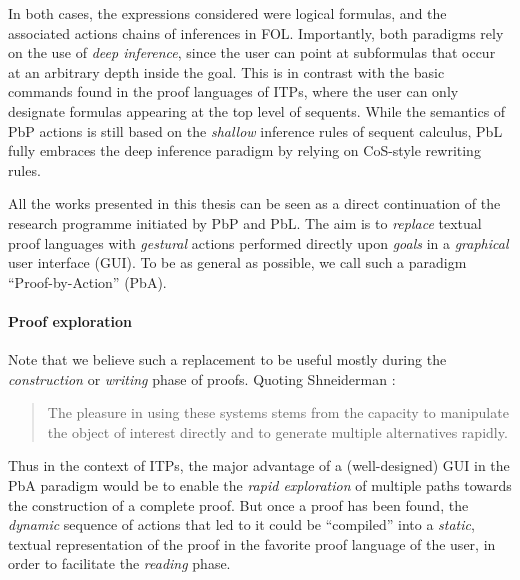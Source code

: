 In both cases, the expressions considered were logical formulas, and the
associated actions chains of inferences in FOL. Importantly, both paradigms rely
on the use of \emph{deep inference}, since the user can point at subformulas
that occur at an arbitrary depth inside the goal. This is in contrast with the
basic commands found in the proof languages of ITPs, where the user can only
designate formulas appearing at the top level of sequents. While the
semantics of PbP actions is still based on the \emph{shallow} inference rules of
sequent calculus, PbL fully embraces the deep inference paradigm by relying on
CoS-style rewriting rules.

\begin{emphpar}
  All the works presented in this thesis can be seen as a direct continuation of
  the research programme initiated by PbP and PbL. The aim is to \emph{replace}
  textual proof languages with \emph{gestural} actions performed directly upon
  \emph{goals} in a \emph{graphical} user interface (GUI). To be as general as
  possible, we call such a paradigm ``Proof-by-Action'' (PbA).
\end{emphpar}

\paragraph{Proof exploration}

Note that we believe such a replacement to be useful mostly during the
\emph{construction} or \emph{writing} phase of proofs. Quoting Shneiderman
\cite{shneiderman_direct_1983}:
\begin{quote}
  The pleasure in using these systems stems from the capacity to manipulate the
object of interest directly and to generate multiple alternatives rapidly.
\end{quote}
Thus in the context of ITPs, the major advantage of a (well-designed) GUI in the
PbA paradigm would be to enable the \emph{rapid exploration} of multiple paths
towards the construction of a complete proof. But once a proof has been found,
the \emph{dynamic} sequence of actions that led to it could be ``compiled'' into
a \emph{static}, textual representation of the proof in the favorite proof
language of the user, in order to facilitate the \emph{reading} phase.

